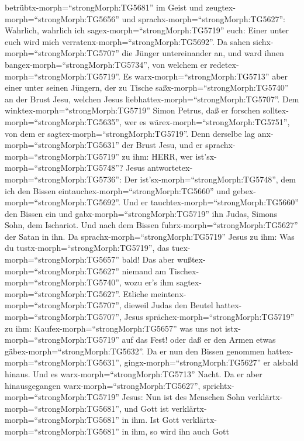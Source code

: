 betrübtx-morph=``strongMorph:TG5681'' im Geist und
zeugtex-morph=``strongMorph:TG5656'' und
sprachx-morph=``strongMorph:TG5627'': Wahrlich, wahrlich ich
sagex-morph=``strongMorph:TG5719'' euch: Einer unter euch wird mich
verratenx-morph=``strongMorph:TG5692''.  Da sahen
sichx-morph=``strongMorph:TG5707'' die Jünger untereinander an, und ward
ihnen bangex-morph=``strongMorph:TG5734'', von welchem er
redetex-morph=``strongMorph:TG5719''.  Es
warx-morph=``strongMorph:TG5713'' aber einer unter seinen Jüngern, der
zu Tische saßx-morph=``strongMorph:TG5740'' an der Brust Jesu, welchen
Jesus liebhattex-morph=``strongMorph:TG5707''.  Dem
winktex-morph=``strongMorph:TG5719'' Simon Petrus, daß er forschen
solltex-morph=``strongMorph:TG5635'', wer es
wärex-morph=``strongMorph:TG5751'', von dem er
sagtex-morph=``strongMorph:TG5719''.  Denn derselbe lag
anx-morph=``strongMorph:TG5631'' der Brust Jesu, und er
sprachx-morph=``strongMorph:TG5719'' zu ihm: HERR, wer
ist'sx-morph=``strongMorph:TG5748''?  Jesus
antwortetex-morph=``strongMorph:TG5736'': Der
ist'sx-morph=``strongMorph:TG5748'', dem ich den Bissen
eintauchex-morph=``strongMorph:TG5660'' und
gebex-morph=``strongMorph:TG5692''. Und er
tauchtex-morph=``strongMorph:TG5660'' den Bissen ein und
gabx-morph=``strongMorph:TG5719'' ihn Judas, Simons Sohn, dem Ischariot.
 Und nach dem Bissen fuhrx-morph=``strongMorph:TG5627'' der
Satan in ihn. Da sprachx-morph=``strongMorph:TG5719'' Jesus zu ihm: Was
du tustx-morph=``strongMorph:TG5719'', das
tuex-morph=``strongMorph:TG5657'' bald!  Das aber
wußtex-morph=``strongMorph:TG5627'' niemand am
Tischex-morph=``strongMorph:TG5740'', wozu er's ihm
sagtex-morph=``strongMorph:TG5627''.  Etliche
meintenx-morph=``strongMorph:TG5707'', dieweil Judas den Beutel
hattex-morph=``strongMorph:TG5707'', Jesus
sprächex-morph=``strongMorph:TG5719'' zu ihm:
Kaufex-morph=``strongMorph:TG5657'' was uns not
istx-morph=``strongMorph:TG5719'' auf das Fest! oder daß er den Armen
etwas gäbex-morph=``strongMorph:TG5632''.  Da er nun den
Bissen genommen hattex-morph=``strongMorph:TG5631'',
gingx-morph=``strongMorph:TG5627'' er alsbald hinaus. Und es
warx-morph=``strongMorph:TG5713'' Nacht.  Da er aber
hinausgegangen warx-morph=``strongMorph:TG5627'',
sprichtx-morph=``strongMorph:TG5719'' Jesus: Nun ist des Menschen Sohn
verklärtx-morph=``strongMorph:TG5681'', und Gott ist
verklärtx-morph=``strongMorph:TG5681'' in ihm.  Ist Gott
verklärtx-morph=``strongMorph:TG5681'' in ihm, so wird ihn auch Gott
